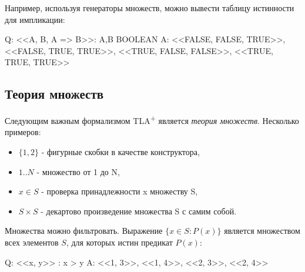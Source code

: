 \documentclass[14pt, openany]{book}
\newcommand{\tlapl}{TLA\textsuperscript{+} }
\begin{document}
\begin{tlatex}
%
%
\end{tlatex}

Например, используя генераторы множеств, можно вывести таблицу истинности для импликации:

\begin{tla}
  Q: {<<A, B, A => B>>: A,B \in BOOLEAN}
  A: {<<FALSE, FALSE, TRUE>>,
      <<FALSE, TRUE, TRUE>>,
      <<TRUE, FALSE, FALSE>>,
      <<TRUE, TRUE, TRUE>>}
\end{tla}
\begin{tlatex}
%
%
%
\end{tlatex}

\subsection{Теория множеств}
Следующим важным формализмом \tlapl является \emph{теория множеств}. Несколько примеров:
\begin{itemize}
  \item \(\{1, 2\}\) - фигурные скобки в качестве конструктора,
  \item \(1..N\) - множество от 1 до N,
  \item \(x \in S\) - проверка принадлежности x множеству S,
  \item \(S  \times S\) - декартово произведение множества S с самим собой.
\end{itemize}

Множества можно фильтровать. Выражение \(\{x \in S: P(x)\}\) является множеством всех элементов \(S\), для которых истин предикат \(P(x)\):

\begin{tla}
   Q: {<<x, y>>  : x > y}
   A: {<<1, 3>>, <<1, 4>>, <<2, 3>>, <<2, 4>>}
\end{tla}
\begin{tlatex}
\end{tlatex}
\end{document}
